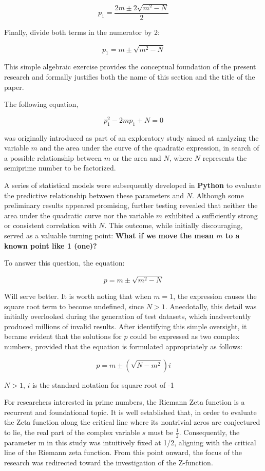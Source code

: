 \documentclass[11pt,a4paper]{article}
\begin{document}
\medskip
\[p_1 = \frac{2m \pm 2\sqrt{m^2 - N}}{2}\]

\medskip
Finally, divide both terms in the numerator by 2:

\[
p_1 = m \pm \sqrt{m^2 - N}
\]

\medskip
This simple algebraic exercise provides the conceptual foundation of the present research and formally justifies both the name of this section and the title of the paper. 

\medskip
The following equation,

\[
p_1^2 - 2mp_1 + N = 0
\]

was originally introduced as part of an exploratory study aimed at analyzing the variable \( m \) and the area under the curve of the quadratic expression, in search of a possible relationship between \( m \) or the area and \( N \), where \( N \) represents the semiprime number to be factorized.

A series of statistical models were subsequently developed in \textbf{Python} to evaluate the predictive relationship between these parameters and \( N \). 
Although some preliminary results appeared promising, further testing revealed that neither the area under the quadratic curve nor the variable \( m \) exhibited a sufficiently strong or consistent correlation with \( N \). 
This outcome, while initially discouraging, served as a valuable turning point: \textbf{What if we move the mean \( m \) to a known point like 1 (one)?}

\medskip
\noindent
To answer this question, the equation: 

\[
p = m \pm \sqrt{m^2 - N}
\]

\noindent
Will serve better.
\medskip
\noindent
It is worth noting that when \( m = 1 \), the expression causes the square root term to become undefined, since \( N > 1 \). 
Anecdotally, this detail was initially overlooked during the generation of test datasets, which inadvertently produced millions of invalid results. 
After identifying this simple oversight, it became evident that the solutions for \( p \) could be expressed as two complex numbers, provided that the equation is formulated appropriately as follows:

\[
p = m \pm (\sqrt{N - m^2}) i
\]

\( N > 1 \), \( i \) is the standard notation for square root of -1  

\medskip
For researchers interested in prime numbers, the Riemann Zeta function is a recurrent and
foundational topic. It is well established that, in order to evaluate the Zeta function along
the critical line where its nontrivial zeros are conjectured to lie, the real part of the
complex variable \( s \) must be \( \tfrac{1}{2} \). Consequently, the parameter m in this study was intuitively fixed at 
1/2, aligning with the critical line of the Riemann zeta function. From this point onward, the focus of the research was redirected toward the investigation of the 
Z-function.
\end{document}
